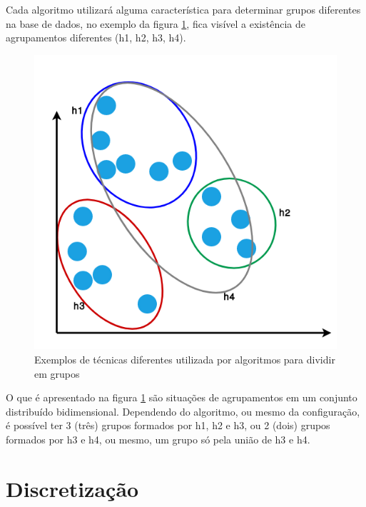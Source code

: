 Cada algoritmo utilizará alguma característica para determinar grupos diferentes na base de dados, no exemplo da figura \ref{fig:planoCartesianoAprendNSup}, fica visível a existência de agrupamentos diferentes (h1, h2, h3, h4). 

\begin{figure}[h!]
    \centering
    \includegraphics[scale=0.4]{figs/amostra_dados_AprendNSuperv.png}
    
    
    \caption{Exemplos de técnicas diferentes utilizada por algoritmos para dividir em grupos} 
    \label{fig:planoCartesianoAprendNSup}     
\end{figure}


O que é apresentado na figura \ref{fig:planoCartesianoAprendNSup} são situações de agrupamentos em um conjunto distribuído bidimensional. Dependendo do algoritmo, ou mesmo da configuração, é possível ter 3 (três) grupos formados por h1, h2 e h3, ou 2 (dois) grupos formados por h3 e h4, ou mesmo, um grupo só pela união de h3 e h4. 


\section{Discretização}\label{cap:refTeor:sec:discret}

